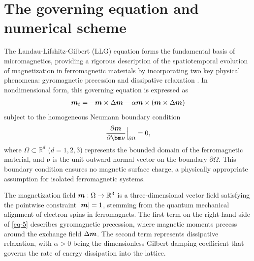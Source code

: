 \documentclass[preprint,times,3p]{elsarticle}
\def\m{\mbox{\boldmath $m$}}
\begin{document}
\section{The governing equation and numerical scheme}
\label{sec: numerical scheme}


The Landau-Lifshitz-Gilbert (LLG) equation forms the fundamental basis of micromagnetics, providing a rigorous description of the spatiotemporal evolution of magnetization in ferromagnetic materials by incorporating two key physical phenomena: gyromagnetic precession and dissipative relaxation \cite{Landau1935On,Brown1963micromagnetics}. In nondimensional form, this governing equation is expressed as
\begin{align}\label{eq-5}
\m_t=-\m\times\Delta\m-\alpha\m\times(\m\times\Delta\m)
\end{align}
subject to the homogeneous Neumann boundary condition
\begin{equation}\label{boundary-large}
\frac{\partial{\m}}{\partial {\bm \nu}}\Big|_{\partial \Omega}=0,
\end{equation}
where \(\Omega \subset \mathbb{R}^d\) (\(d=1,2,3\)) represents the bounded domain of the ferromagnetic material, and \(\bm \nu\) is the unit outward normal vector on the boundary \(\partial \Omega\). This boundary condition ensures no magnetic surface charge, a physically appropriate assumption for isolated ferromagnetic systems.

The magnetization field \(\m: \Omega \to \mathbb{R}^3\) is a three-dimensional vector field satisfying the pointwise constraint \(|\m| = 1\),  stemming from the quantum mechanical alignment of electron spins in ferromagnets. The first term on the right-hand side of \cref{eq-5} describes gyromagnetic precession, where magnetic moments precess around the exchange field $\Delta \m$. The second term represents dissipative relaxation, with \(\alpha > 0\) being the dimensionless Gilbert damping coefficient that governs the rate of energy dissipation into the lattice.
\end{document}
